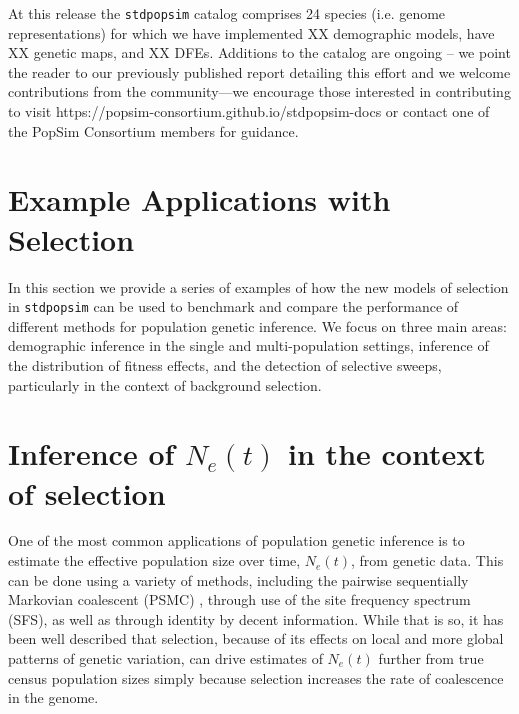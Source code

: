 \documentclass[hidelinks]{article}
\newcommand{\stdpopsim}{\texttt{stdpopsim}\xspace}
\begin{document}
    At this release the \stdpopsim catalog comprises 24 species (i.e. genome representations)
    for which we have implemented XX demographic models, have XX genetic maps, and XX DFEs.
    Additions to the catalog are ongoing -- we point the reader to our previously published 
    report detailing this effort \citep{lauterbur2023expanding} and we welcome contributions from the
    community---we encourage those interested in contributing to visit https://popsim-consortium.github.io/stdpopsim-docs
    or contact one of the PopSim Consortium members for guidance.


    
\section*{Example Applications with Selection}
    \label{applications}
    In this section we provide a series of examples of how the new models of selection
    in \stdpopsim can be used to benchmark and compare the performance of different
    methods for population genetic inference.
    We focus on three main areas: demographic inference in the 
    single and multi-population settings, inference of the distribution of fitness effects,
    and the detection of selective sweeps, particularly in the context of background selection.

    \section*{Inference of $N_e(t)$ in the context of selection}
    One of the most common applications of population genetic inference is to estimate
    the effective population size over time, $N_e(t)$, from genetic data. This can be done
    using a variety of methods, including the pairwise sequentially Markovian coalescent
    (PSMC) \citep{li2011inference}, through use of the site frequency spectrum (SFS),
    as well as through identity by decent information. 
    While that is so, it has been well described that selection, because of its effects on
    local and more global patterns of genetic variation, can drive estimates of $N_e(t)$
    further from true census population sizes simply because selection increases the 
    rate of coalescence in the genome. 
\end{document}
